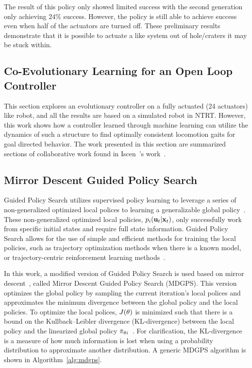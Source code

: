 The result of this policy only showed limited success with the second generation only achieving \(24\%\) success.
However, the policy is still able to achieve success even when half of the actuators are turned off.
These preliminary results demonstrate that it is possible to actuate a \SB{} like system out of hole/craters it may be stuck within.

\subsection{Co-Evolutionary Learning for an Open Loop Controller}
\label{sec:openLoopControl}
This section explores an evolutionary controller on a fully actuated (24 actuators) \SB{} like robot, and all the results are based on a simulated robot in NTRT.
However, this work shows how a controller learned through machine learning can utilize the dynamics of such a structure to find optimally consistent locomotion gaits for goal directed behavior.
The work presented in this section are summarized sections of collaborative work found in Iscen~\etal's work~\cite{iscen2015learning}.



\subsection{Mirror Descent Guided Policy Search}
\label{sec:mdgps}

Guided Policy Search utilizes supervised policy learning to leverage a series of non-generalized optimized local polices to learning a generalizable global policy~\cite{lk-gps-13}.
These non-generalized optimized local policies, $p_i(\mathbf{u}_t|\mathbf{x}_t)$, only successfully work from specific initial states and require full state information.
Guided Policy Search allows for the use of simple and efficient methods for training the local policies,
such as trajectory optimization methods when there is a known model, or
trajectory-centric reinforcement learning methods~\cite{la-lnnpg-14}.

In this work, a modified version of Guided Policy Search is used based on mirror descent~\cite{ml-gpsam-16}, called Mirror Descent Guided Policy Search (MDGPS).
This version optimizes the global policy by sampling the current iteration's local polices and approximates the minimum divergence between the global policy and the local policies.
To optimize the local polices, $J(\theta)$ is minimized such that there is a bound on the Kullback–Leibler divergence (KL-divergence) between the local policy and the linearized global policy $\bar{\pi}_{\theta{i}}$~\cite{bagnell2003covariant,ps-rlmsp-08,pma-reps-10,slmja-trpo-15}.
For clarification, the KL-divergence is a measure of how much information is lost when using a probability distribution to approximate another distribution.
A generic MDGPS algorithm is shown in Algorithm~\ref{alg:mdgps}.

